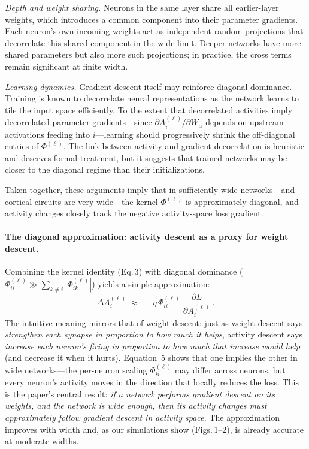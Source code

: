 \documentclass[10pt]{article}
\begin{document}
\emph{Depth and weight sharing.}  Neurons in the same layer share all earlier-layer weights, which introduces a common component into their parameter gradients.  Each neuron's own incoming weights act as independent random projections that decorrelate this shared component in the wide limit.  Deeper networks have more shared parameters but also more such projections; in practice, the cross terms remain significant at finite width.

\emph{Learning dynamics.}  Gradient descent itself may reinforce diagonal dominance.  Training is known to decorrelate neural representations as the network learns to tile the input space efficiently.  To the extent that decorrelated activities imply decorrelated parameter gradients---since $\partial A_i^{(\ell)}/\partial W_\alpha$ depends on upstream activations feeding into $i$---learning should progressively shrink the off-diagonal entries of $\Phi^{(\ell)}$.  The link between activity and gradient decorrelation is heuristic and deserves formal treatment, but it suggests that trained networks may be closer to the diagonal regime than their initializations.

Taken together, these arguments imply that in sufficiently wide networks---and cortical circuits are very wide---the kernel $\Phi^{(\ell)}$ is approximately diagonal, and activity changes closely track the negative activity-space loss gradient.

\paragraph{The diagonal approximation: activity descent as a proxy for weight descent.}
Combining the kernel identity (Eq.\,3) with diagonal dominance ($\Phi^{(\ell)}_{ii}\gg\sum_{k\neq i}|\Phi^{(\ell)}_{ik}|$) yields a simple approximation:
%
\begin{equation}\label{eq:diag}
  \Delta A_i^{(\ell)} \;\approx\; -\eta\,\Phi^{(\ell)}_{ii}\;\frac{\partial L}{\partial A_i^{(\ell)}}\,.
\end{equation}
%
The intuitive meaning mirrors that of weight descent: just as weight descent says \emph{strengthen each synapse in proportion to how much it helps}, activity descent says \emph{increase each neuron's firing in proportion to how much that increase would help} (and decrease it when it hurts).  Equation~5 shows that one implies the other in wide networks---the per-neuron scaling $\Phi^{(\ell)}_{ii}$ may differ across neurons, but every neuron's activity moves in the direction that locally reduces the loss.  This is the paper's central result: \emph{if a network performs gradient descent on its weights, and the network is wide enough, then its activity changes must approximately follow gradient descent in activity space.}  The approximation improves with width and, as our simulations show (Figs.\,1--2), is already accurate at moderate widths.
\end{document}
